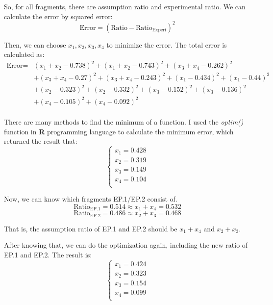 \documentclass{article}
\begin{document}
            So, for all fragments, there are assumption ratio and experimental ratio. We can calculate the error by squared error:
            $$\text{Error} = (\text{Ratio} - \text{Ratio}_{\text{Experi}})^2$$

            Then, we can choose $x_1, x_2, x_3, x_4$ to minimize the error. The total error is calculated as:
            $$\begin{aligned}
            \text{Error} = &(x_1 + x_2 - 0.738) ^ 2 + (x_1 + x_2 - 0.743) ^ 2 + (x_3 + x_4 - 0.262) ^ 2\\
            &+(x_3 + x_4 - 0.27) ^ 2 + (x_3 + x_4 - 0.243) ^ 2 + (x_1 - 0.434)^2 + (x_1 - 0.44)^2\\
            &+(x_2 - 0.323)^2 + (x_2 - 0.332)^2 + (x_3 - 0.152)^2 + (x_3 - 0.136)^2\\
            &+(x_4 - 0.105)^2 + (x_4 - 0.092)^2\\
            \end{aligned}$$

            There are many methods to find the minimum of a function. I used the \textit{optim()} function in \textbf{R} programming language to calculate the minimum error, which returned the result that:
            $$\left\{\begin{aligned}
            x_1 = 0.428\\
            x_2 = 0.319\\
            x_3 = 0.149\\
            x_4 = 0.104\\
            \end{aligned}\right.$$

            Now, we can know which fragments EP.1/EP.2 consist of.
            $$\text{Ratio}_{\text{EP.1}} = 0.514 \approx x_1 + x_4 = 0.532$$
            $$\text{Ratio}_{\text{EP.2}} = 0.486 \approx x_2 + x_3 = 0.468$$

            That is, the assumption ratio of EP.1 and EP.2 should be $x_1 + x_4 \text{ and } x_2 + x_3$.

            After knowing that, we can do the optimization again, including the new ratio of EP.1 and EP.2.
            The result is:
            $$\left\{\begin{aligned}
            x_1 = 0.424\\
            x_2 = 0.323\\
            x_3 = 0.154\\
            x_4 = 0.099\\
            \end{aligned}\right.$$
\end{document}

